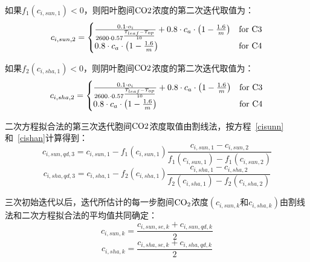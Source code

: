 如果$f_{1}\left(c_{i,sun,1}\right)<0$，则阳叶胞间$\rm CO2$浓度的第二次迭代取值为：
\begin{align}\label{cisun_2_fn}
c_{i,sun,2}=
\begin{cases}
\frac{0.1 \cdot o_{i}} {2600 \cdot 0.57 ^\frac{T_{{leaf }} -  T_{o p}}{10}} + 0.8\cdot c_{a}\cdot\left(1-\frac{1.6}{m}\right)  &\rm for\,\, C3\\
0.8\cdot c_{a}\cdot\left(1-\frac{1.6}{m}\right) &\rm for\,\, C4
\end{cases}
\end{align}

如果$f_{2}\left(c_{i,sha,1}\right)<0$，则阴叶胞间$\rm CO2$浓度的第二次迭代取值为：
\begin{align}\label{cisha_2_fn}
c_{i,sha,2}=
\begin{cases}
\frac{0.1 \cdot o_{i}} {2600. \cdot 0.57 ^\frac{T_{{leaf }} -  T_{o p}}{10}} + 0.8\cdot c_{a}\cdot\left(1-\frac{1.6}{m}\right)  &\rm for\,\, C3\\
0.8\cdot c_{a}\cdot\left(1-\frac{1.6}{m}\right) &\rm for\,\, C4
\end{cases}
\end{align}

二次方程拟合法的第三次迭代胞间$\rm CO2$浓度取值由割线法，按方程~\eqref{cisunn} 和~\eqref{cishan}计算得到：
%
\begin{equation}\label{cisun3}
c_{i,sun,qd,3}=c_{i,sun,1}-f_{1}\left(c_{i,sun,1}\right)\frac{c_{i,sun,1}-c_{i,sun,2}}{ f_{1}\left(c_{i,sun,1}\right)-f_{1}\left(c_{i,sun,2}\right)} 
\end{equation}
\begin{equation}\label{cisha3}
c_{i,sha,qd,3}=c_{i,sha,1}-f_{2}\left(c_{i,sha,1}\right)\frac{c_{i,sha,1}-c_{i,sha,2}}{ f_{2}\left(c_{i,sha,1}\right)-f_{2}\left(c_{i,sha,2}\right)} 
\end{equation}

三次初始迭代以后，迭代所估计的每一步胞间$\rm CO_2$浓度$\left(c_{i,sun,k}和c_{i,sha,k}\right)$由割线法和二次方程拟合法的平均值共同确定：
\begin{equation}
c_{i,sun,k}=\frac{c_{i,sun,se,k}+c_{i,sun,qd,k}}{2}
\end{equation}
\begin{equation}
c_{i,sha,k}=\frac{c_{i,sha,se,k}+c_{i,sha,qd,k}}{2}
\end{equation}


